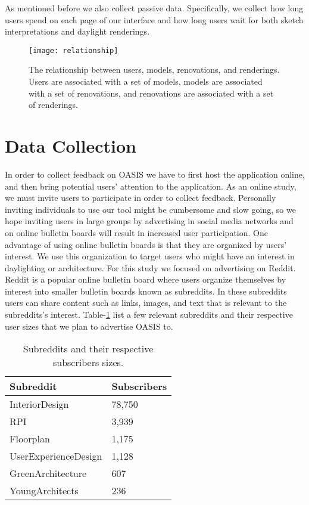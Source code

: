 				
	As mentioned before we also collect passive data.
	Specifically, we collect how long users spend on each page of our interface and how long users wait for both  sketch interpretations and daylight renderings.

	\begin{figure}[h]
	\caption[The relationship between users, models, renovations, and renderings.]{The relationship between users, models, renovations, and renderings. Users are associated with a set of models, models are associated with a set of renovations, and renovations are associated with a set of renderings.}
	\label{fig:rel}	
	\texttt{[image: relationship]}

	\end{figure}


\section{Data Collection}
	In order to collect feedback on OASIS we have to first host the application online, and then bring potential users' attention to the application. As an online study, we must invite users to participate in order to collect feedback.
	Personally inviting individuals to use our tool might be cumbersome and slow going, so we hope inviting users in large groups by advertising in social media networks and on online bulletin boards will result in increased user participation. One advantage of using online bulletin boards is that they are organized by users' interest.  We use this organization to target users who might have an interest in daylighting or architecture. For this study we focused on advertising on  Reddit\cite{todo}. Reddit is a popular online bulletin board where users organize themselves by interest into smaller bulletin boards known as subreddits. In these subreddits users can share content such as links, images, and text that is relevant to the subreddits's interest. Table-\ref{fig:reddit} list a few relevant subreddits and their respective user sizes that we plan to advertise OASIS to.
	

	\begin{table}[ht!]
	\centering
	    \caption{Subreddits and their respective subscribers sizes.}
	    \label{fig:reddit}
	    \begin{tabular}{ | l | l | }
	        \hline
		    Subreddit               & Subscribers  \\ \hline
		    InteriorDesign 			& 78,750        \\ \hline
		    RPI 			        & 3,939         \\ \hline
		    Floorplan    			& 1,175         \\ \hline
		    UserExperienceDesign    & 1,128         \\ \hline
		    GreenArchitecture 		& 607          \\ \hline
		    YoungArchitects 		& 236          \\ \hline
	    \end{tabular}
	\end{table}

